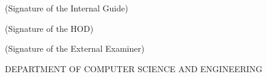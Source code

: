 \vspace{6\baselineskip}
\begin{minipage}[c]{0.45\textwidth}
\centering
\noindent\makebox[\linewidth]{\dotfill}


\vspace{0.5\baselineskip}
{ (Signature of the Internal Guide)} \\
\end{minipage}
\hspace{1.0\baselineskip}
\begin{minipage}[c]{0.45\textwidth}
\centering
\noindent\makebox[\linewidth]{\dotfill}
\vspace{0.5\baselineskip}
{ (Signature of the HOD)} \\
\end{minipage}
\vspace{3\baselineskip}

\begin{center}
\begin{minipage}[c]{0.45\textwidth}
\centering

\noindent\makebox[\linewidth]{\dotfill}
\vspace{0.5\baselineskip}
{ (Signature of the External Examiner)} 
\end{minipage}
\end{center}

\vspace{3\baselineskip}

\noindent\makebox[\linewidth]{\dotfill}
\begin{center}
          DEPARTMENT OF COMPUTER SCIENCE AND ENGINEERING 
\end{center}
\noindent\makebox[\linewidth]{\dotfill}
